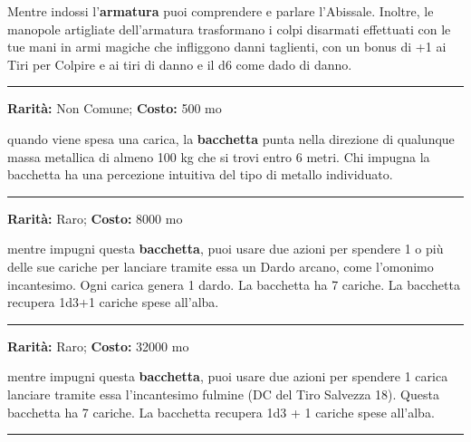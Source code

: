 \begin{multicols}{2}
Mentre indossi l'\textbf{armatura} puoi comprendere e parlare l'Abissale. Inoltre, le manopole artigliate dell'armatura trasformano i colpi disarmati effettuati con le tue mani in armi magiche che infliggono danni taglienti, con un bonus di +1 ai Tiri per Colpire e ai tiri di danno e il d6 come dado di danno.

\smallskip\noindent\rule{\linewidth}{2pt}  \hypertarget{BacchettaCercametalli}{}\smallskip{}\noindent\label{BacchettaCercametalli}

\textbf{Rarità:} Non Comune; \textbf{Costo:} 500 mo

quando viene spesa una carica, la \textbf{bacchetta} punta nella direzione di qualunque massa metallica di almeno 100 kg che si trovi entro 6 metri. Chi impugna la bacchetta ha una percezione intuitiva del tipo di metallo individuato.

\smallskip\noindent\rule{\linewidth}{2pt}  \hypertarget{BacchettadeiDardiArcani}{}\smallskip{}\noindent\label{BacchettadeiDardiArcani}

\textbf{Rarità:} Raro; \textbf{Costo:} 8000 mo

mentre impugni questa \textbf{bacchetta}, puoi usare due azioni per spendere 1 o più delle sue cariche per lanciare tramite essa un Dardo arcano, come l'omonimo incantesimo. Ogni carica genera 1 dardo. La bacchetta ha 7 cariche. La bacchetta recupera 1d3+1 cariche spese all'alba.

\smallskip\noindent\rule{\linewidth}{2pt}  \hypertarget{BacchettadeiFulmini}{}\smallskip{}\noindent\label{BacchettadeiFulmini}

\textbf{Rarità:} Raro; \textbf{Costo:} 32000 mo

mentre impugni questa \textbf{bacchetta}, puoi usare due azioni per spendere 1 carica lanciare tramite essa l'incantesimo fulmine (DC del Tiro Salvezza 18).
Questa bacchetta ha 7 cariche. La bacchetta recupera 1d3 + 1 cariche spese all'alba.

\smallskip\noindent\rule{\linewidth}{2pt}  \hypertarget{BacchettadeiSegreti}{}\smallskip{}\noindent\label{BacchettadeiSegreti}


\end{multicols}
